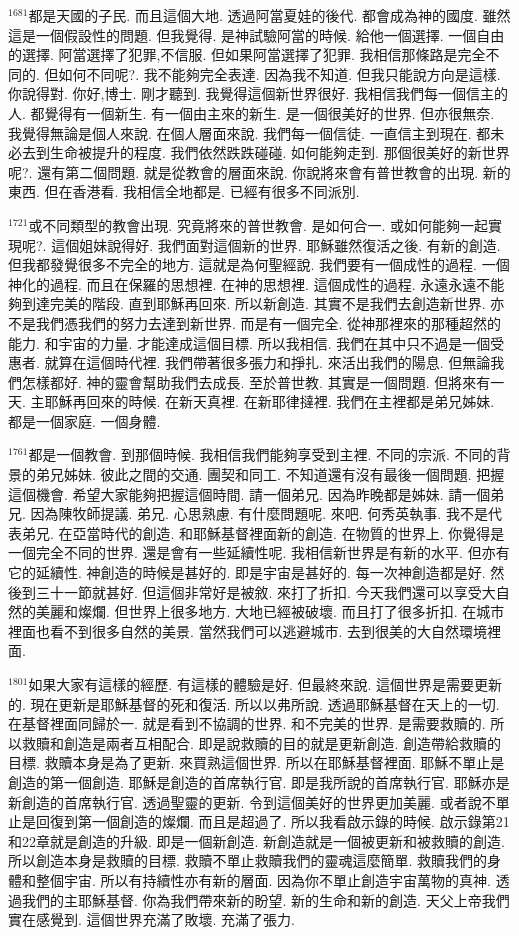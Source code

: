 \documentclass{book}
\begin{document}
$^{1681}$都是天國的子民.
而且這個大地.
透過阿當夏娃的後代.
都會成為神的國度.
雖然這是一個假設性的問題.
但我覺得.
是神試驗阿當的時候.
給他一個選擇.
一個自由的選擇.
阿當選擇了犯罪,不信服.
但如果阿當選擇了犯罪.
我相信那條路是完全不同的.
但如何不同呢?.
我不能夠完全表達.
因為我不知道.
但我只能說方向是這樣.
你說得對.
你好,博士.
剛才聽到.
我覺得這個新世界很好.
我相信我們每一個信主的人.
都覺得有一個新生.
有一個由主來的新生.
是一個很美好的世界.
但亦很無奈.
我覺得無論是個人來說.
在個人層面來說.
我們每一個信徒.
一直信主到現在.
都未必去到生命被提升的程度.
我們依然跌跌碰碰.
如何能夠走到.
那個很美好的新世界呢?.
還有第二個問題.
就是從教會的層面來說.
你說將來會有普世教會的出現.
新的東西.
但在香港看.
我相信全地都是.
已經有很多不同派別.

$^{1721}$或不同類型的教會出現.
究竟將來的普世教會.
是如何合一.
或如何能夠一起實現呢?.
這個姐妹說得好.
我們面對這個新的世界.
耶穌雖然復活之後.
有新的創造.
但我都發覺很多不完全的地方.
這就是為何聖經說.
我們要有一個成性的過程.
一個神化的過程.
而且在保羅的思想裡.
在神的思想裡.
這個成性的過程.
永遠永遠不能夠到達完美的階段.
直到耶穌再回來.
所以新創造.
其實不是我們去創造新世界.
亦不是我們憑我們的努力去達到新世界.
而是有一個完全.
從神那裡來的那種超然的能力.
和宇宙的力量.
才能達成這個目標.
所以我相信.
我們在其中只不過是一個受惠者.
就算在這個時代裡.
我們帶著很多張力和掙扎.
來活出我們的陽息.
但無論我們怎樣都好.
神的靈會幫助我們去成長.
至於普世教.
其實是一個問題.
但將來有一天.
主耶穌再回來的時候.
在新天真裡.
在新耶律撻裡.
我們在主裡都是弟兄姊妹.
都是一個家庭.
一個身體.

$^{1761}$都是一個教會.
到那個時候.
我相信我們能夠享受到主裡.
不同的宗派.
不同的背景的弟兄姊妹.
彼此之間的交通.
團契和同工.
不知道還有沒有最後一個問題.
把握這個機會.
希望大家能夠把握這個時間.
請一個弟兄.
因為昨晚都是姊妹.
請一個弟兄.
因為陳牧師提議.
弟兄.
心思熟慮.
有什麼問題呢.
來吧.
何秀英執事.
我不是代表弟兄.
在亞當時代的創造.
和耶穌基督裡面新的創造.
在物質的世界上.
你覺得是一個完全不同的世界.
還是會有一些延續性呢.
我相信新世界是有新的水平.
但亦有它的延續性.
神創造的時候是甚好的.
即是宇宙是甚好的.
每一次神創造都是好.
然後到三十一節就甚好.
但這個非常好是被敘.
來打了折扣.
今天我們還可以享受大自然的美麗和燦爛.
但世界上很多地方.
大地已經被破壞.
而且打了很多折扣.
在城市裡面也看不到很多自然的美景.
當然我們可以逃避城市.
去到很美的大自然環境裡面.

$^{1801}$如果大家有這樣的經歷.
有這樣的體驗是好.
但最終來說.
這個世界是需要更新的.
現在更新是耶穌基督的死和復活.
所以以弗所說.
透過耶穌基督在天上的一切.
在基督裡面同歸於一.
就是看到不協調的世界.
和不完美的世界.
是需要救贖的.
所以救贖和創造是兩者互相配合.
即是說救贖的目的就是更新創造.
創造帶給救贖的目標.
救贖本身是為了更新.
來買熟這個世界.
所以在耶穌基督裡面.
耶穌不單止是創造的第一個創造.
耶穌是創造的首席執行官.
即是我所說的首席執行官.
耶穌亦是新創造的首席執行官.
透過聖靈的更新.
令到這個美好的世界更加美麗.
或者說不單止是回復到第一個創造的燦爛.
而且是超過了.
所以我看啟示錄的時候.
啟示錄第21和22章就是創造的升級.
即是一個新創造.
新創造就是一個被更新和被救贖的創造.
所以創造本身是救贖的目標.
救贖不單止救贖我們的靈魂這麼簡單.
救贖我們的身體和整個宇宙.
所以有持續性亦有新的層面.
因為你不單止創造宇宙萬物的真神.
透過我們的主耶穌基督.
你為我們帶來新的盼望.
新的生命和新的創造.
天父上帝我們實在感覺到.
這個世界充滿了敗壞.
充滿了張力.
\end{document}
